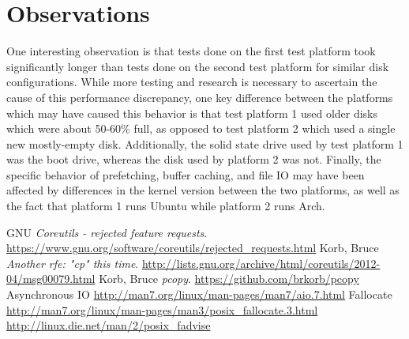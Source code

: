 \documentclass[12pt]{article}
\begin{document}
\section{Observations}
One interesting observation is that tests done on the first test platform took significantly longer
than tests done on the second test platform for similar disk configurations. While more testing and
research is necessary to ascertain the cause of this performance discrepancy, one key difference between
the platforms which may have caused this behavior is that test platform 1 used older disks which were
about 50-60\% full, as opposed to test platform 2 which used a single new mostly-empty disk. Additionally,
the solid state drive used by test platform 1 was the boot drive, whereas the disk used by platform 2
was not. Finally, the specific behavior of prefetching, buffer caching, and file IO may have been affected by differences
in the kernel version between the two platforms, as well as the fact that platform 1 runs Ubuntu while platform 2 runs Arch. \\

\begin{thebibliography}{9}
    GNU
    \emph{Coreutils - rejected feature requests}.
    \url{https://www.gnu.org/software/coreutils/rejected_requests.html}
    Korb, Bruce
    \emph{Another rfe: "cp" this time}.
    \url{http://lists.gnu.org/archive/html/coreutils/2012-04/msg00079.html}
    Korb, Bruce
    \emph{pcopy}.
    \url{https://github.com/brkorb/pcopy}
    Asynchronous IO
    \url{http://man7.org/linux/man-pages/man7/aio.7.html}
    Fallocate
    \url{http://man7.org/linux/man-pages/man3/posix\_fallocate.3.html}
    \url{http://linux.die.net/man/2/posix\_fadvise}
\end{thebibliography}
\end{document}
